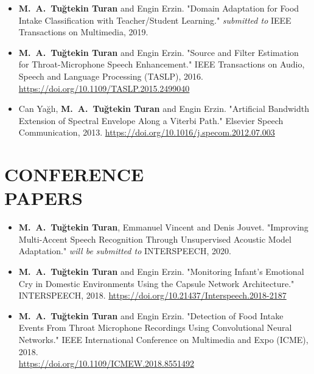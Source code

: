 \documentclass[margin, 10pt]{res} %
\begin{document}
\begin{resume}
\begin{itemize}[leftmargin=*]
    \item \textbf{M.~A.~Tu\u{g}tekin Turan} and Engin Erzin. "Domain Adaptation for Food Intake Classification with Teacher/Student Learning." \textit{submitted to} IEEE Transactions on Multimedia, 2019.

    \item \textbf{M.~A.~Tu\u{g}tekin Turan} and Engin Erzin. "Source and Filter Estimation for Throat-Microphone Speech Enhancement." IEEE Transactions on Audio, Speech and Language Processing (TASLP), 2016. \\ \url{https://doi.org/10.1109/TASLP.2015.2499040}

    \item Can Ya\u{g}l\i, \textbf{M.~A.~Tu\u{g}tekin Turan} and Engin Erzin. "Artificial Bandwidth Extension of Spectral Envelope Along a Viterbi Path." Elsevier Speech Communication, 2013. \hspace{.1em}
    \url{https://doi.org/10.1016/j.specom.2012.07.003}
\end{itemize}

\vspace{1em}
\section{CONFERENCE \\ PAPERS}

\begin{itemize}[leftmargin=*]
    \item \textbf{M.~A.~Tu\u{g}tekin Turan}, Emmanuel Vincent and Denis Jouvet. "Improving Multi-Accent Speech Recognition Through Unsupervised Acoustic Model Adaptation." \textit{will be submitted to} INTERSPEECH, 2020. \hspace{.1em}

    \item \textbf{M.~A.~Tu\u{g}tekin Turan} and Engin Erzin. "Monitoring Infant's Emotional Cry in Domestic Environments Using the Capsule Network Architecture." INTERSPEECH, 2018. \hspace{.1em} \url{https://doi.org/10.21437/Interspeech.2018-2187}


    \item \textbf{M.~A.~Tu\u{g}tekin Turan} and Engin Erzin. "Detection of Food Intake Events From Throat Microphone Recordings Using Convolutional Neural Networks." IEEE International Conference on Multimedia and Expo (ICME), 2018. \\ \url{https://doi.org/10.1109/ICMEW.2018.8551492}


\end{itemize}
\end{resume}
\end{document}
